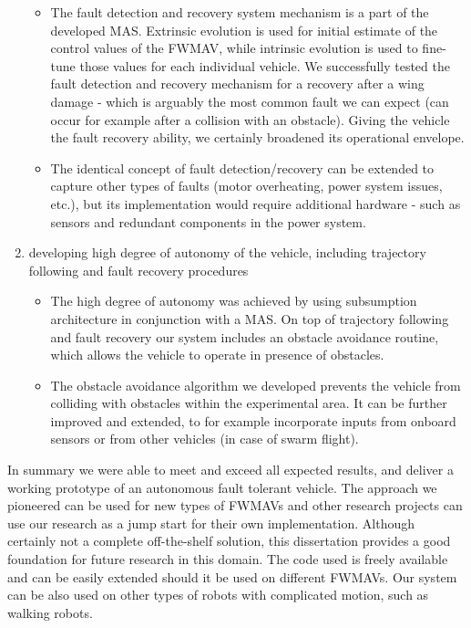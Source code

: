 \begin{enumerate}
	\begin{itemize}
	\item The fault detection and recovery system mechanism is a part of the developed MAS. Extrinsic evolution is used for initial estimate of the control values of the FWMAV, while intrinsic evolution is used to fine-tune those values for each individual vehicle. We successfully tested the fault detection and recovery mechanism for a recovery after a wing damage - which is arguably the most common fault we can expect (can occur for example after a collision with an obstacle). Giving the vehicle the fault recovery ability, we certainly broadened its operational envelope.
	\item The identical concept of fault detection/recovery can be extended to capture other types of faults (motor overheating, power system issues, etc.), but its implementation would require additional hardware - such as sensors and redundant components in the power system.
	\end{itemize}
\item developing high degree of autonomy of the vehicle, including trajectory following and fault recovery procedures
	\begin{itemize}
	\item The high degree of autonomy was achieved by using subsumption architecture in conjunction with a MAS. On top of trajectory following and fault recovery our system includes an obstacle avoidance routine, which allows the vehicle to operate in presence of obstacles.
	\item The obstacle avoidance algorithm we developed prevents the vehicle from colliding with obstacles within the experimental area. It can be further improved and extended, to for example incorporate inputs from onboard sensors or from other vehicles (in case of swarm flight).
	\end{itemize}
\end{enumerate}

In summary we were able to meet and exceed all expected results, and deliver a working prototype of an autonomous fault tolerant vehicle. The approach we pioneered can be used for new types of FWMAVs and other research projects can use our research as a jump start for their own implementation. Although certainly not a complete off-the-shelf solution, this dissertation provides a good foundation for future research in this domain. The code used is freely available and can be easily extended should it be used on different FWMAVs. Our system can be also used on other types of robots with complicated motion, such as walking robots.

